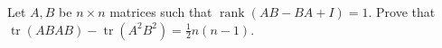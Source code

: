 Let \(A, B\) be \(n \times n\) matrices such that \(\operatorname{rank}(AB-BA+I) = 1.\) Prove that \(\operatorname{tr}(ABAB)-\operatorname{tr}(A^2 B^2) = \frac{1}{2}n(n-1).\)